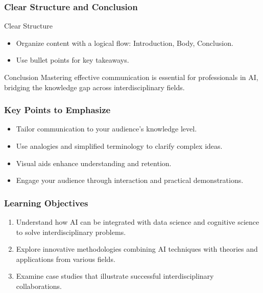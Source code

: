 \documentclass[aspectratio=169]{beamer}
\begin{document}
\begin{frame}[fragile]
    \frametitle{Clear Structure and Conclusion}
    \begin{block}{Clear Structure}
        \begin{itemize}
            \item Organize content with a logical flow: Introduction, Body, Conclusion.
            \item Use bullet points for key takeaways.
        \end{itemize}
    \end{block}
    \begin{block}{Conclusion}
        Mastering effective communication is essential for professionals in AI, bridging the knowledge gap across interdisciplinary fields.
    \end{block}
\end{frame}

\begin{frame}[fragile]
    \frametitle{Key Points to Emphasize}
    \begin{itemize}
        \item Tailor communication to your audience's knowledge level.
        \item Use analogies and simplified terminology to clarify complex ideas.
        \item Visual aids enhance understanding and retention.
        \item Engage your audience through interaction and practical demonstrations.
    \end{itemize}
\end{frame}

\begin{frame}[fragile]
    \frametitle{Learning Objectives}
    \begin{enumerate}
        \item Understand how AI can be integrated with data science and cognitive science to solve interdisciplinary problems.
        \item Explore innovative methodologies combining AI techniques with theories and applications from various fields.
        \item Examine case studies that illustrate successful interdisciplinary collaborations.
    \end{enumerate}
\end{frame}
\end{document}
